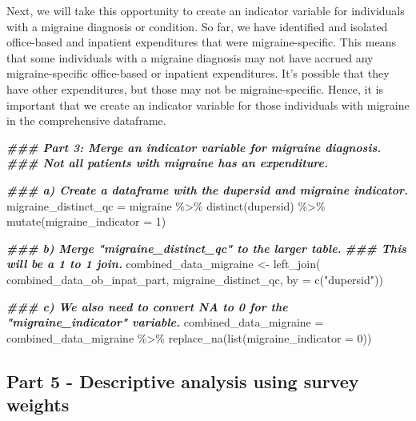 \documentclass[
]{book}
\newenvironment{Shaded}{\begin{snugshade}}{\end{snugshade}}
\newcommand{\AttributeTok}[1]{\textcolor[rgb]{0.77,0.63,0.00}{#1}}
\newcommand{\DecValTok}[1]{\textcolor[rgb]{0.00,0.00,0.81}{#1}}
\newcommand{\DocumentationTok}[1]{\textcolor[rgb]{0.56,0.35,0.01}{\textbf{\textit{#1}}}}
\newcommand{\FunctionTok}[1]{\textcolor[rgb]{0.00,0.00,0.00}{#1}}
\newcommand{\NormalTok}[1]{#1}
\newcommand{\OtherTok}[1]{\textcolor[rgb]{0.56,0.35,0.01}{#1}}
\newcommand{\SpecialCharTok}[1]{\textcolor[rgb]{0.00,0.00,0.00}{#1}}
\newcommand{\StringTok}[1]{\textcolor[rgb]{0.31,0.60,0.02}{#1}}
\begin{document}
Next, we will take this opportunity to create an indicator variable for individuals with a migraine diagnosis or condition. So far, we have identified and isolated office-based and inpatient expenditures that were migraine-specific. This means that some individuals with a migraine diagnosis may not have accrued any migraine-specific office-based or inpatient expenditures. It's possible that they have other expenditures, but those may not be migraine-specific. Hence, it is important that we create an indicator variable for those individuals with migraine in the comprehensive dataframe.

\begin{Shaded}
\begin{Highlighting}[]
\DocumentationTok{\#\#\# Part 3: Merge an indicator variable for migraine diagnosis. }
\DocumentationTok{\#\#\# Not all patients with migraine has an expenditure.}

\DocumentationTok{\#\#\# a) Create a dataframe with the dupersid and migraine indicator.}
\NormalTok{migraine\_distinct\_qc }\OtherTok{=}\NormalTok{ migraine }\SpecialCharTok{\%\textgreater{}\%} 
  \FunctionTok{distinct}\NormalTok{(dupersid) }\SpecialCharTok{\%\textgreater{}\%}
  \FunctionTok{mutate}\NormalTok{(}\AttributeTok{migraine\_indicator =} \DecValTok{1}\NormalTok{)}

\DocumentationTok{\#\#\# b) Merge "migraine\_distinct\_qc" to the larger table.}
\DocumentationTok{\#\#\# This will be a 1 to 1 join.}
\NormalTok{combined\_data\_migraine }\OtherTok{\textless{}{-}} \FunctionTok{left\_join}\NormalTok{(}
\NormalTok{  combined\_data\_ob\_inpat\_part,}
\NormalTok{  migraine\_distinct\_qc,}
  \AttributeTok{by =} \FunctionTok{c}\NormalTok{(}\StringTok{"dupersid"}\NormalTok{))}

\DocumentationTok{\#\#\# c) We also need to convert NA to 0 for the "migraine\_indicator" variable.}
\NormalTok{combined\_data\_migraine }\OtherTok{=}\NormalTok{ combined\_data\_migraine }\SpecialCharTok{\%\textgreater{}\%}
  \FunctionTok{replace\_na}\NormalTok{(}\FunctionTok{list}\NormalTok{(}\AttributeTok{migraine\_indicator =} \DecValTok{0}\NormalTok{))}
\end{Highlighting}
\end{Shaded}

\hypertarget{part-5---descriptive-analysis-using-survey-weights}{%
\subsection{Part 5 - Descriptive analysis using survey weights}\label{part-5---descriptive-analysis-using-survey-weights}}
\end{document}
